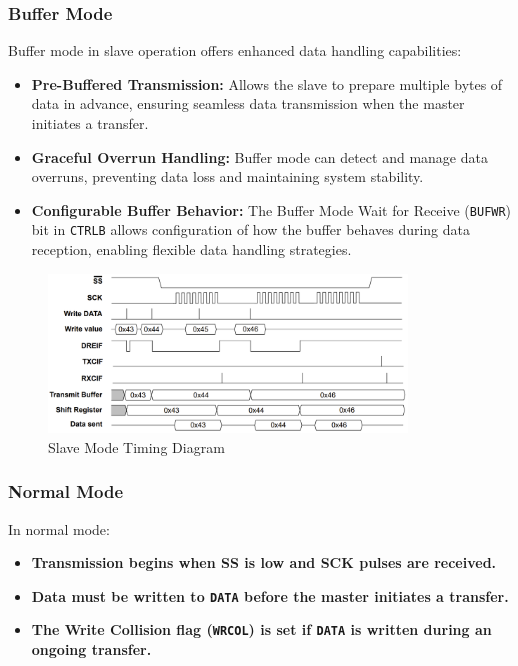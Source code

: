\documentclass{article}
\begin{document}
\subsubsection{Buffer Mode}
Buffer mode in slave operation offers enhanced data handling capabilities:

\begin{itemize}
    \item \textbf{Pre-Buffered Transmission:} Allows the slave to prepare multiple bytes of data in advance, ensuring seamless data transmission when the master initiates a transfer.
    \item \textbf{Graceful Overrun Handling:} Buffer mode can detect and manage data overruns, preventing data loss and maintaining system stability.
    \item \textbf{Configurable Buffer Behavior:} The Buffer Mode Wait for Receive (\texttt{BUFWR}) bit in \texttt{CTRLB} allows configuration of how the buffer behaves during data reception, enabling flexible data handling strategies.
\end{itemize}

\begin{figure}[H]
    \centering
    \includegraphics[width=0.85\textwidth]{images/spi_slave_timing.png}
    \caption{Slave Mode Timing Diagram}
    \label{fig:spi_slave_timing}
\end{figure}

\subsubsection{Normal Mode}
In normal mode:

\begin{itemize}
    \item \textbf{Transmission begins when SS is low and SCK pulses are received.}
    \item \textbf{Data must be written to \texttt{DATA} before the master initiates a transfer.}
    \item \textbf{The Write Collision flag (\texttt{WRCOL}) is set if \texttt{DATA} is written during an ongoing transfer.}
\end{itemize}
\end{document}
